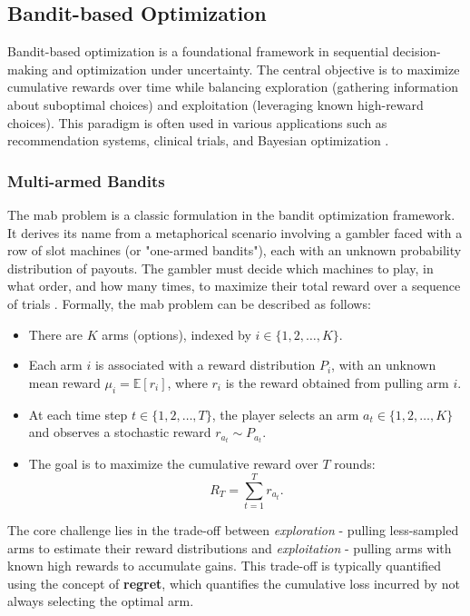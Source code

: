 \subsection{Bandit-based Optimization}
Bandit-based optimization is a foundational framework in sequential decision-making and optimization under uncertainty. The central objective is to maximize cumulative rewards over time while balancing exploration (gathering information about suboptimal choices) and exploitation (leveraging known high-reward choices). This paradigm is often used in various applications such as recommendation systems, clinical trials, and Bayesian optimization \citep{lattimore2020bandit, bubeck2012regret}.

\subsubsection{Multi-armed Bandits}
The \ac{mab} problem is a classic formulation in the bandit optimization framework. It derives its name from a metaphorical scenario involving a gambler faced with a row of slot machines (or "one-armed bandits"), each with an unknown probability distribution of payouts. The gambler must decide which machines to play, in what order, and how many times, to maximize their total reward over a sequence of trials \citep{robbins1952some}. Formally, the \ac{mab} problem can be described as follows:
\begin{itemize}
    \item There are $K$ arms (options), indexed by $i \in \{1, 2, \ldots, K\}$.
    \item Each arm $i$ is associated with a reward distribution $P_i$, with an unknown mean reward $\mu_i = \mathbb{E}[r_i]$, where $r_i$ is the reward obtained from pulling arm $i$.
    \item At each time step $t \in \{1, 2, \ldots, T\}$, the player selects an arm $a_t \in \{1, 2, \ldots, K\}$ and observes a stochastic reward $r_{a_t} \sim P_{a_t}$.
    \item The goal is to maximize the cumulative reward over $T$ rounds:
    \begin{equation}
        R_T = \sum_{t=1}^T r_{a_t}.
    \end{equation}
\end{itemize}

The core challenge lies in the trade-off between \textit{exploration} - pulling less-sampled arms to estimate their reward distributions and \textit{exploitation} - pulling arms with known high rewards to accumulate gains. This trade-off is typically quantified using the concept of \textbf{regret}, which quantifies the cumulative loss incurred by not always selecting the optimal arm.

